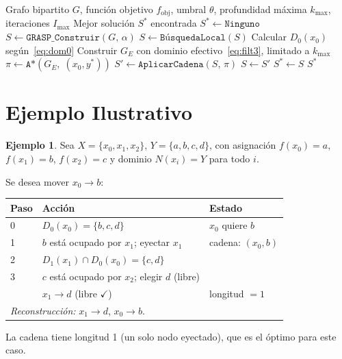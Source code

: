 \documentclass[12pt, a4paper]{article}
\theoremstyle{definition}
\newtheorem{example}{Ejemplo}[section]
\theoremstyle{plain}
\theoremstyle{remark}
\newcommand{\GE}{G_{\!E}}
\newcommand{\domk}[2]{D_{#1}\!\left(#2\right)}
\newcommand{\Nset}[1]{N\!\left(#1\right)}
\begin{document}
\begin{algorithm}[H]
\caption{GRASP + Ejection Chains con Conjunto Eyectado Mínimo}
\label{alg:full}
\begin{algorithmic}[1]
\Require Grafo bipartito $G$, función objetivo $f_{\text{obj}}$,
         umbral $\theta$, profundidad máxima $k_{\max}$, iteraciones $I_{\max}$
\Ensure Mejor solución $S^*$ encontrada
\State $S^* \leftarrow \texttt{Ninguno}$
  \State $S \leftarrow \texttt{GRASP\_Construir}(G,\, \alpha)$
  \State $S \leftarrow \texttt{BúsquedaLocal}(S)$
    \State Calcular $\domk{0}{x_0}$ según~\eqref{eq:dom0}
    \State Construir $\GE$ con dominio efectivo~\eqref{eq:filt3},
           limitado a $k_{\max}$
    \State $\pi \leftarrow \texttt{A*}(\GE,\; (x_0, y^*))$
      \State $S' \leftarrow \texttt{AplicarCadena}(S,\, \pi)$
        \State $S \leftarrow S'$
      \EndIf
    \EndIf
  \EndFor
    \State $S^* \leftarrow S$
  \EndIf
\EndFor
\Return $S^*$
\end{algorithmic}
\end{algorithm}

\section{Ejemplo Ilustrativo}

\begin{example}
  Sea $X = \{x_0, x_1, x_2\}$, $Y = \{a, b, c, d\}$,
  con asignación $f(x_0) = a$, $f(x_1) = b$, $f(x_2) = c$
  y dominio $\Nset{x_i} = Y$ para todo $i$.

  Se desea mover $x_0 \to b$:

  \medskip
  \begin{center}
  \begin{tabular}{lll}
  \toprule
  Paso & Acción & Estado \\
  \midrule
  0 & $\domk{0}{x_0} = \{b, c, d\}$ & $x_0$ quiere $b$ \\
  1 & $b$ está ocupado por $x_1$; eyectar $x_1$ & cadena: $(x_0, b)$ \\
  2 & $\domk{1}{x_1} \cap \domk{0}{x_0} = \{c, d\}$ & \\
  3 & $c$ está ocupado por $x_2$; elegir $d$ (libre) & \\
    & $x_1 \to d$ (libre $\checkmark$) & longitud $= 1$ \\
  \midrule
  \multicolumn{3}{l}{\textit{Reconstrucción:} $x_1 \to d$,\; $x_0 \to b$.} \\
  \bottomrule
  \end{tabular}
  \end{center}

  La cadena tiene longitud 1 (un solo nodo eyectado), que es el óptimo para
  este caso.
\end{example}
\end{document}
